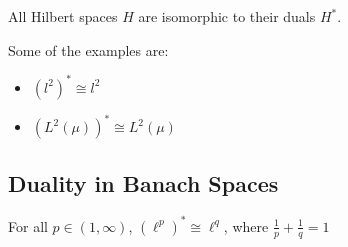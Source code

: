 \documentclass{article}
\begin{document}
\begin{corollary}
    All Hilbert spaces  \(H\) are isomorphic to their duals  \(H^*\).
\end{corollary}  


\begin{example}
    Some of the examples are:  
    \begin{itemize}
        \item  \((l^2)^* \cong l^2\)
        \item  \((L^2(\mu))^* \cong L^2(\mu)\)
    \end{itemize}
\end{example}


\subsection{Duality in Banach Spaces}  

\begin{theorem}\nl
 For all  \(p \in (1, \infty)\),  \((\ell^p)^* \cong \ell^q\), where  \(\frac{1}{p}+\frac{1}{q}=1\)
\end{theorem}  
\end{document}
